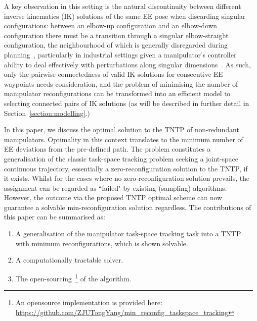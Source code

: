 \documentclass[letterpaper, 10 pt, conference]{ieeeconf}  %
\begin{document}
A key observation in this setting is the natural discontinuity between different inverse kinematics (IK) solutions of the same EE pose when discarding singular configurations: between an 
elbow-up configuration and an elbow-down configuration there must be a transition through a singular elbow-straight configuration, the neighbourhood of which is generally 
disregarded during planning~\cite{Mayorga1988Singularities}, particularly in industrial settings given a manipulator's controller ability to deal effectively with perturbations along singular dimensions~\cite{Xu2015Singularity}. 
As such, only the pairwise connectedness of valid IK solutions for consecutive EE waypoints needs consideration, and the problem of minimising the number of manipulator 
reconfigurations can be transformed into an efficient model to selecting connected pairs of IK solutions (as will be described in further detail in Section~\ref{section:modelling}.) 

In this paper, we discuss the optimal solution to the TNTP of non-redundant manipulators. Optimality in this context translates to the minimum number of EE deviations from the pre-defined path. The problem constitutes a generalisation of the classic task-space tracking problem seeking a joint-space continuous trajectory, essentially a zero-reconfiguration solution to the TNTP, if it exists. Whilst for the cases where no zero-reconfiguration solution prevails, the assignment can be regarded as ``failed" by existing (sampling) algorithms. However, the outcome via the proposed TNTP optimal scheme can now guarantee a solvable min-reconfiguration solution regardless. The contributions of this paper can be summarised as: 
\begin{enumerate}
\item A generalisation of the manipulator task-space tracking task into a TNTP with minimum reconfigurations, which is shown solvable. 
\item A computationally tractable solver. %
\item The open-sourcing~\footnote{An opensource implementation is provided here: \url{https://github.com/ZJUTongYang/min_reconfig_taskspace_tracking}} of the algorithm.
\end{enumerate}
\end{document}
